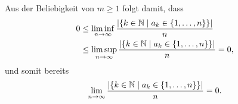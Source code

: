 \documentclass[a4paper,10pt]{article}
\begin{document}
Aus der Beliebigkeit von $m \geq 1$ folgt damit, dass
\begin{align*}
 0 
 &\leq \liminf_{n \to \infty} \frac{|\{k \in \mathbb{N} \mid a_k \in \{1, \dotsc, n\}\}|}{n} \\
 &\leq \limsup_{n \to \infty} \frac{|\{k \in \mathbb{N} \mid a_k \in \{1, \dotsc, n\}\}|}{n}
 = 0,
\end{align*}
und somit bereits
\[
 \lim_{n \to \infty} \frac{|\{k \in \mathbb{N} \mid a_k \in \{1, \dotsc, n\}\}|}{n} = 0.
\]
\end{document}
